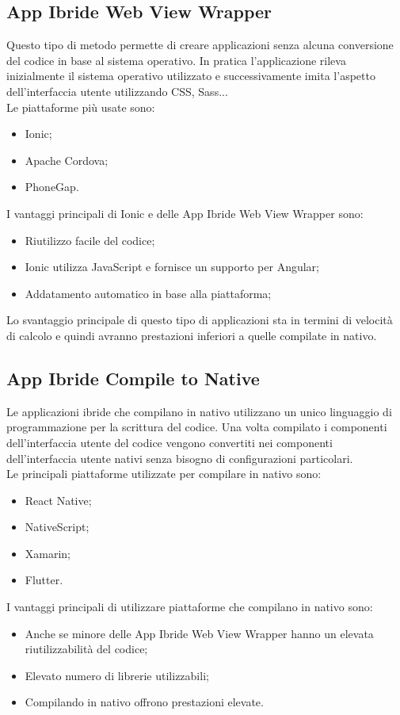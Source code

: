 \subsection{App Ibride Web View Wrapper}
Questo tipo di metodo permette di creare applicazioni senza alcuna conversione del codice in base al sistema operativo. In pratica l'applicazione rileva inizialmente il sistema operativo utilizzato e successivamente imita l'aspetto dell'interfaccia utente utilizzando CSS, Sass...\\
Le piattaforme più usate sono:
\begin{itemize}
\item Ionic; 
\item Apache Cordova; 
\item PhoneGap.
\end{itemize}
I vantaggi principali di Ionic e delle App Ibride Web View Wrapper sono:
\begin{itemize}
	\item Riutilizzo facile del codice; 
	\item Ionic utilizza JavaScript e fornisce un supporto per Angular;
	\item Addatamento automatico in base alla piattaforma; 
\end{itemize}
Lo svantaggio principale di questo tipo di applicazioni sta in termini di velocità di calcolo e quindi avranno prestazioni inferiori a quelle compilate in nativo.\\

\subsection{App Ibride Compile to Native}
Le applicazioni ibride che compilano in nativo utilizzano un unico linguaggio di programmazione per la scrittura del codice. Una volta compilato i componenti dell'interfaccia utente del codice vengono convertiti nei componenti dell'interfaccia utente nativi senza bisogno di configurazioni particolari.\\
Le principali piattaforme utilizzate per compilare in nativo sono:
\begin{itemize}
	\item React Native; 
	\item NativeScript; 
	\item Xamarin; 
	\item Flutter.
\end{itemize}
I vantaggi principali di utilizzare piattaforme che compilano in nativo sono:
\begin{itemize}
	\item Anche se minore delle App Ibride Web View Wrapper hanno un elevata riutilizzabilità del codice; 
	\item Elevato numero di librerie utilizzabili;  
	\item Compilando in nativo offrono prestazioni elevate.
\end{itemize}
\newpage
